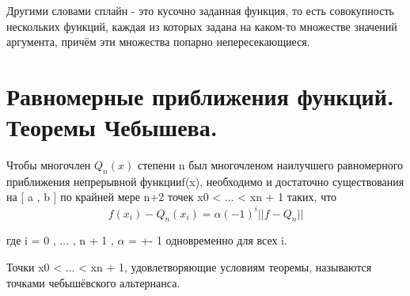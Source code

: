 \documentclass[a4paper, 12pt]{article}
\begin{document}
Другими словами сплайн - это кусочно заданная функция, то есть совокупность нескольких функций, каждая из которых задана на каком-то множестве значений аргумента, причём эти множества попарно непересекающиеся. 
\section{Равномерные приближения функций. Теоремы Чебышева.}
Чтобы многочлен $ Q_{n}(x)  $ степени n был многочленом наилучшего равномерного приближения непрерывной функцииf(x), необходимо и достаточно существования на [ a , b ] по крайней мере n+2 точек x0 < ... < xn + 1 таких, что
\[
       f(x_{i})-Q_{n}(x_{i})=\alpha (-1)^{i}||f-Q_{n}||
\]

где i = 0 , ... , n + 1 , $ \alpha $ = +- 1 одновременно для всех i.

Точки x0 < ... < xn + 1, удовлетворяющие условиям теоремы, называются точками чебышёвского альтернанса. 
\section{}
\section{}
\section{}
\section{}
\section{}
\section{}
\section{}
\section{}
\section{}
\section{}
\end{document}
